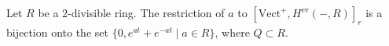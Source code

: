 Let $R$ be a $2$-divisible ring. The restriction of $a$ to $[\mathrm{Vect}^+, H^{\mathrm{ev}}(-, R)]_r$ is a bijection onto the set $\{0, e^{at} + e^{-at} \mid a \in R\}$, where $Q \subset R$.
